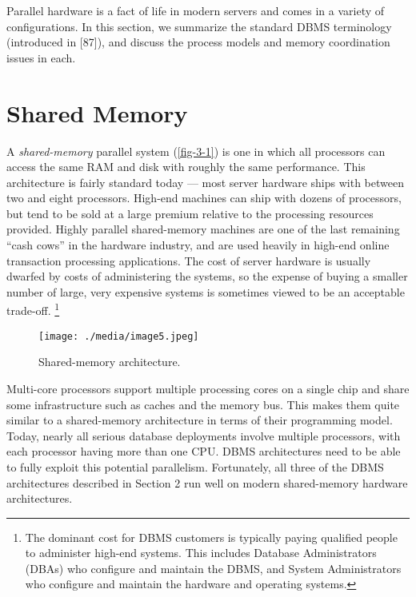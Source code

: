\documentclass[a4paper,11pt,twoside,openright]{book}
\begin{document}
Parallel hardware is a fact of life in modern servers and comes in a
variety of configurations. In this section, we summarize the standard
DBMS terminology (introduced in {[}87{]}), and discuss the process
models and memory coordination issues in each.

\hypertarget{shared-memory}{%
\section{Shared Memory}\label{shared-memory}}

A \emph{shared-memory} parallel system (\autoref{fig-3-1}) is one in which all
processors can access the same RAM and disk with roughly the same
performance. This architecture is fairly standard today --- most server
hardware ships with between two and eight processors. High-end machines
can ship with dozens of processors, but tend to be sold at a large
premium relative to the processing resources provided. Highly parallel
shared-memory machines are one of the last remaining ``cash cows'' in
the hardware industry, and are used heavily in high-end online
transaction processing applications. The cost of server hardware is
usually dwarfed by costs of administering the systems, so the expense of
buying a smaller number of large, very expensive systems is sometimes
viewed to be an acceptable trade-off.
\footnote{The dominant cost for DBMS customers is typically paying qualified
people to administer high-end systems. This includes Database
Administrators (DBAs) who configure and maintain the DBMS, and System
Administrators who configure and maintain the hardware and operating
systems.}

\begin{figure}
\centering
\texttt{[image: ./media/image5.jpeg]}

\caption{Shared-memory architecture.\label{fig-3-1}}
\end{figure}

Multi-core processors support multiple processing cores on a single
chip and share some infrastructure such as caches and the memory bus.
This makes them quite similar to a shared-memory architecture in terms
of their programming model. Today, nearly all serious database
deployments involve multiple processors, with each processor having more
than one CPU. DBMS architectures need to be able to fully exploit this
potential parallelism. Fortunately, all three of the DBMS architectures
described in Section 2 run well on modern shared-memory hardware
architectures.
\end{document}
